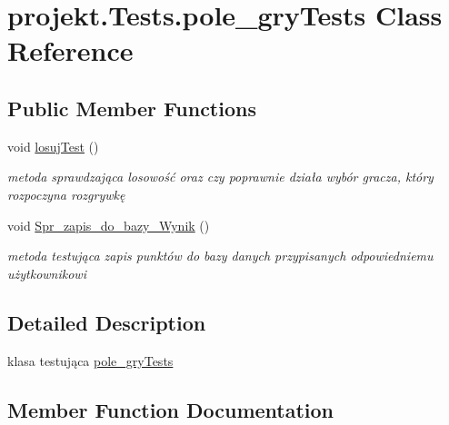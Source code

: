 \hypertarget{classprojekt_1_1_tests_1_1pole__gry_tests}{}\section{projekt.\+Tests.\+pole\+\_\+gry\+Tests Class Reference}
\label{classprojekt_1_1_tests_1_1pole__gry_tests}


 


\subsection*{Public Member Functions}
\begin{DoxyCompactItemize}
\item 
void \mbox{\hyperlink{classprojekt_1_1_tests_1_1pole__gry_tests_a452be98c348cb92cdfb70eadeb3df1d0}{losuj\+Test}} ()
\begin{DoxyCompactList}\small\item\em metoda sprawdzająca losowość oraz czy poprawnie działa wybór gracza, który rozpoczyna rozgrywkę \end{DoxyCompactList}\item 
void \mbox{\hyperlink{classprojekt_1_1_tests_1_1pole__gry_tests_ad19d9a740af149c53c775875154982db}{Spr\+\_\+zapis\+\_\+do\+\_\+bazy\+\_\+\+Wynik}} ()
\begin{DoxyCompactList}\small\item\em metoda testująca zapis punktów do bazy danych przypisanych odpowiedniemu użytkownikowi \end{DoxyCompactList}\end{DoxyCompactItemize}


\subsection{Detailed Description}


klasa testująca \mbox{\hyperlink{classprojekt_1_1_tests_1_1pole__gry_tests}{pole\+\_\+gry\+Tests}} 

\subsection{Member Function Documentation}
\mbox{\label{classprojekt_1_1_tests_1_1pole__gry_tests_a452be98c348cb92cdfb70eadeb3df1d0}} 
